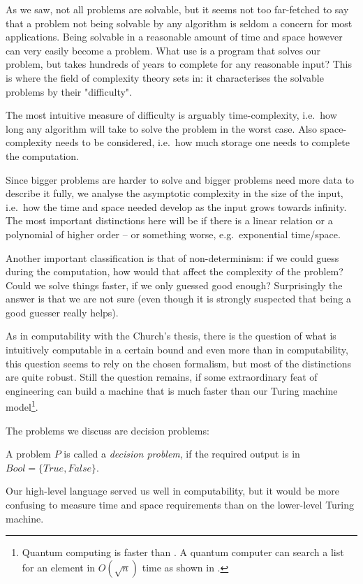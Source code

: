 As we saw, not all problems are solvable, but it seems not too far-fetched to
say that a problem not being solvable by any algorithm is seldom a concern for
most applications. Being solvable in a reasonable amount of time and space
however can very easily become a problem. What use is a program that solves our
problem, but takes hundreds of years to complete for any reasonable input? This
is where the field of complexity theory sets in: it characterises the solvable
problems by their "difficulty".

The most intuitive measure of difficulty is arguably time-complexity, i.e.\ how
long any algorithm will take to solve the problem in the worst case. Also
space-complexity needs to be considered, i.e.\ how much storage one needs to
complete the computation.

Since bigger problems are harder to solve and bigger problems need more data to
describe it fully, we analyse the asymptotic complexity in the size of the
input, i.e.\ how the time and space needed develop as the input grows towards
infinity. The most important distinctions here will be if there is a linear
relation or a polynomial of higher order -- or something worse, e.g.\ exponential
time/space.

Another important classification is that of non-determinism: if we could guess
during the computation, how would that affect the complexity of the problem?
Could we solve things faster, if we only guessed good enough? Surprisingly the
answer is that we are not sure (even though it is strongly suspected that being
a good guesser really helps).

As in computability with the Church's thesis, there is the question of what is
intuitively computable in a certain bound and even more than in computability,
this question seems to rely on the chosen formalism, but most of the
distinctions are quite robust. Still the question remains, if some
extraordinary feat of engineering can build a machine that is much faster than
our Turing machine model\footnote{Quantum computing is faster than \TM\@. A 
	quantum computer can search a list for an element in $O(\sqrt{n})$ time as 
	shown in \cite{grover1996fast}.}. 

The problems we discuss are decision problems:
\begin{defn}
	A problem $P$ is called a \emph{decision problem}, if the required output is 
	in $Bool = \{True, False\}$.
\end{defn}

Our high-level \WHILE language served us well in computability, but it would
be more confusing to measure time and space requirements than on the
lower-level Turing machine.

